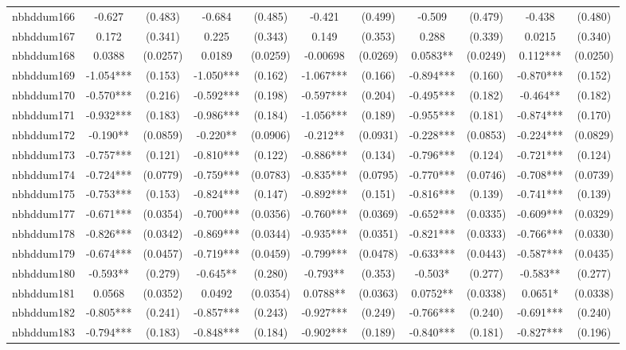 \documentclass[]{article}
\begin{document}
\begin{tabular}{lcccccccccc}
nbhddum166 & -0.627 & (0.483) & -0.684 & (0.485) & -0.421 & (0.499) & -0.509 & (0.479) & -0.438 & (0.480) \\
nbhddum167 & 0.172 & (0.341) & 0.225 & (0.343) & 0.149 & (0.353) & 0.288 & (0.339) & 0.0215 & (0.340) \\
nbhddum168 & 0.0388 & (0.0257) & 0.0189 & (0.0259) & -0.00698 & (0.0269) & 0.0583** & (0.0249) & 0.112*** & (0.0250) \\
nbhddum169 & -1.054*** & (0.153) & -1.050*** & (0.162) & -1.067*** & (0.166) & -0.894*** & (0.160) & -0.870*** & (0.152) \\
nbhddum170 & -0.570*** & (0.216) & -0.592*** & (0.198) & -0.597*** & (0.204) & -0.495*** & (0.182) & -0.464** & (0.182) \\
nbhddum171 & -0.932*** & (0.183) & -0.986*** & (0.184) & -1.056*** & (0.189) & -0.955*** & (0.181) & -0.874*** & (0.170) \\
nbhddum172 & -0.190** & (0.0859) & -0.220** & (0.0906) & -0.212** & (0.0931) & -0.228*** & (0.0853) & -0.224*** & (0.0829) \\
nbhddum173 & -0.757*** & (0.121) & -0.810*** & (0.122) & -0.886*** & (0.134) & -0.796*** & (0.124) & -0.721*** & (0.124) \\
nbhddum174 & -0.724*** & (0.0779) & -0.759*** & (0.0783) & -0.835*** & (0.0795) & -0.770*** & (0.0746) & -0.708*** & (0.0739) \\
nbhddum175 & -0.753*** & (0.153) & -0.824*** & (0.147) & -0.892*** & (0.151) & -0.816*** & (0.139) & -0.741*** & (0.139) \\
nbhddum177 & -0.671*** & (0.0354) & -0.700*** & (0.0356) & -0.760*** & (0.0369) & -0.652*** & (0.0335) & -0.609*** & (0.0329) \\
nbhddum178 & -0.826*** & (0.0342) & -0.869*** & (0.0344) & -0.935*** & (0.0351) & -0.821*** & (0.0333) & -0.766*** & (0.0330) \\
nbhddum179 & -0.674*** & (0.0457) & -0.719*** & (0.0459) & -0.799*** & (0.0478) & -0.633*** & (0.0443) & -0.587*** & (0.0435) \\
nbhddum180 & -0.593** & (0.279) & -0.645** & (0.280) & -0.793** & (0.353) & -0.503* & (0.277) & -0.583** & (0.277) \\
nbhddum181 & 0.0568 & (0.0352) & 0.0492 & (0.0354) & 0.0788** & (0.0363) & 0.0752** & (0.0338) & 0.0651* & (0.0338) \\
nbhddum182 & -0.805*** & (0.241) & -0.857*** & (0.243) & -0.927*** & (0.249) & -0.766*** & (0.240) & -0.691*** & (0.240) \\
nbhddum183 & -0.794*** & (0.183) & -0.848*** & (0.184) & -0.902*** & (0.189) & -0.840*** & (0.181) & -0.827*** & (0.196) \\

\end{tabular}
\end{document}
